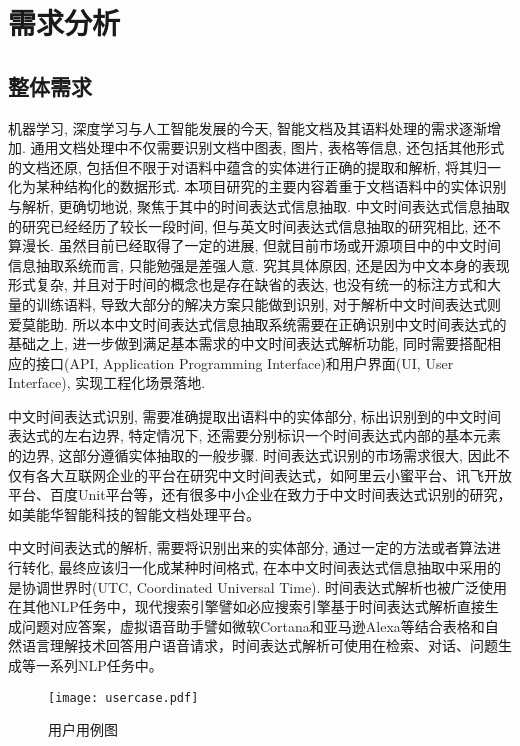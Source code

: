 
\chapter{需求分析}

\section{整体需求}

机器学习, 深度学习与人工智能发展的今天, 智能文档及其语料处理的需求逐渐增加.
通用文档处理中不仅需要识别文档中图表, 图片, 表格等信息, 还包括其他形式的文档还原, 包括但不限于对语料中蕴含的实体进行正确的提取和解析, 将其归一化为某种结构化的数据形式.
本项目研究的主要内容着重于文档语料中的实体识别与解析, 更确切地说, 聚焦于其中的时间表达式信息抽取.
中文时间表达式信息抽取的研究已经经历了较长一段时间, 但与英文时间表达式信息抽取的研究相比, 还不算漫长.
虽然目前已经取得了一定的进展, 但就目前市场或开源项目中的中文时间信息抽取系统而言, 只能勉强是差强人意.
究其具体原因, 还是因为中文本身的表现形式复杂, 并且对于时间的概念也是存在缺省的表达, 也没有统一的标注方式和大量的训练语料, 导致大部分的解决方案只能做到识别, 对于解析中文时间表达式则爱莫能助.
所以本中文时间表达式信息抽取系统需要在正确识别中文时间表达式的基础之上, 进一步做到满足基本需求的中文时间表达式解析功能, 同时需要搭配相应的接口(API, Application Programming Interface)和用户界面(UI, User Interface), 实现工程化场景落地.

中文时间表达式识别, 需要准确提取出语料中的实体部分, 标出识别到的中文时间表达式的左右边界, 特定情况下, 还需要分别标识一个时间表达式内部的基本元素的边界, 这部分遵循实体抽取的一般步骤.
时间表达式识别的市场需求很大, 因此不仅有各大互联网企业的平台在研究中文时间表达式，如阿里云小蜜平台、讯飞开放平台、百度Unit平台等，还有很多中小企业在致力于中文时间表达式识别的研究，如美能华智能科技的智能文档处理平台。

中文时间表达式的解析, 需要将识别出来的实体部分, 通过一定的方法或者算法进行转化, 最终应该归一化成某种时间格式, 在本中文时间表达式信息抽取中采用的是协调世界时(UTC, Coordinated Universal Time).
时间表达式解析也被广泛使用在其他NLP任务中，现代搜索引擎譬如必应搜索引擎基于时间表达式解析直接生成问题对应答案，虚拟语音助手譬如微软Cortana和亚马逊Alexa等结合表格和自然语言理解技术回答用户语音请求，时间表达式解析可使用在检索、对话、问题生成等一系列NLP任务中。

\begin{figure}[h]
    \centering
    \texttt{[image: usercase.pdf]}
    \caption{用户用例图}
    \label{fig:usecase}
\end{figure}


